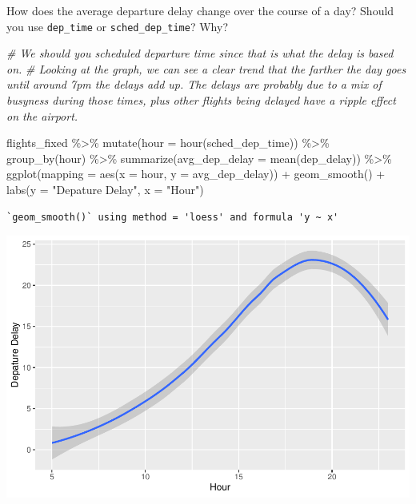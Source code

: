 \documentclass[
]{article}
\newenvironment{Shaded}{\begin{snugshade}}{\end{snugshade}}
\newcommand{\AttributeTok}[1]{\textcolor[rgb]{0.77,0.63,0.00}{#1}}
\newcommand{\CommentTok}[1]{\textcolor[rgb]{0.56,0.35,0.01}{\textit{#1}}}
\newcommand{\FunctionTok}[1]{\textcolor[rgb]{0.00,0.00,0.00}{#1}}
\newcommand{\NormalTok}[1]{#1}
\newcommand{\SpecialCharTok}[1]{\textcolor[rgb]{0.00,0.00,0.00}{#1}}
\newcommand{\StringTok}[1]{\textcolor[rgb]{0.31,0.60,0.02}{#1}}
\begin{document}
How does the average departure delay change over the course of a day?
Should you use \texttt{dep\_time} or \texttt{sched\_dep\_time}? Why?

\begin{Shaded}
\begin{Highlighting}[]
\CommentTok{\# We should you scheduled departure time since that is what the delay is based on.}
\CommentTok{\# Looking at the graph, we can see a clear trend that the farther the day goes until around 7pm the delays add up. The delays are probably due to a mix of busyness during those times, plus other flights being delayed have a ripple effect on the airport.}

\NormalTok{flights\_fixed }\SpecialCharTok{\%\textgreater{}\%}
  \FunctionTok{mutate}\NormalTok{(}\AttributeTok{hour =} \FunctionTok{hour}\NormalTok{(sched\_dep\_time)) }\SpecialCharTok{\%\textgreater{}\%}
  \FunctionTok{group\_by}\NormalTok{(hour) }\SpecialCharTok{\%\textgreater{}\%}
  \FunctionTok{summarize}\NormalTok{(}\AttributeTok{avg\_dep\_delay =} \FunctionTok{mean}\NormalTok{(dep\_delay)) }\SpecialCharTok{\%\textgreater{}\%}
  \FunctionTok{ggplot}\NormalTok{(}\AttributeTok{mapping =} \FunctionTok{aes}\NormalTok{(}\AttributeTok{x =}\NormalTok{ hour, }\AttributeTok{y =}\NormalTok{ avg\_dep\_delay)) }\SpecialCharTok{+}
  \FunctionTok{geom\_smooth}\NormalTok{() }\SpecialCharTok{+}
  \FunctionTok{labs}\NormalTok{(}\AttributeTok{y =} \StringTok{"Depature Delay"}\NormalTok{, }\AttributeTok{x =} \StringTok{"Hour"}\NormalTok{)}
\end{Highlighting}
\end{Shaded}

\begin{verbatim}
`geom_smooth()` using method = 'loess' and formula 'y ~ x'
\end{verbatim}

\includegraphics{MidtermPR_files/figure-latex/unnamed-chunk-6-1.pdf}
\end{document}
